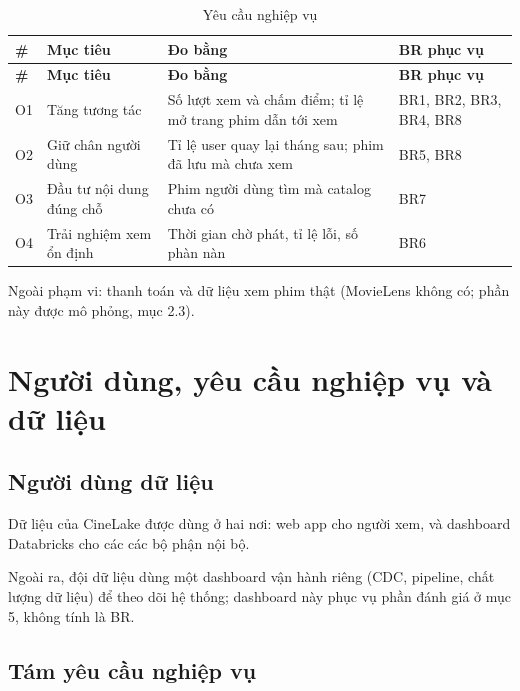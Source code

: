 \documentclass[a4paper,11pt]{article}
\newlength{\reporttablewidth}
\begin{document}
\begingroup
\small
{}
\setlength{\tabcolsep}{4pt}
\renewcommand{\arraystretch}{1.18}
\setlength{\reporttablewidth}{\dimexpr\linewidth-6\tabcolsep\relax}
\begin{longtable}{@{}L{0.08\reporttablewidth} L{0.28\reporttablewidth} L{0.43\reporttablewidth} L{0.21\reporttablewidth}@{}}
\caption[Yêu cầu nghiệp vụ (mục 1.2)]{Yêu cầu nghiệp vụ}\label{tab:01} \\
\toprule
\textbf{\#} & \textbf{Mục tiêu} & \textbf{Đo bằng} & \textbf{BR phục vụ} \\
\midrule
\endfirsthead
\toprule
\textbf{\#} & \textbf{Mục tiêu} & \textbf{Đo bằng} & \textbf{BR phục vụ} \\
\midrule
\endhead
\midrule
\endfoot
\bottomrule
\endlastfoot
O1 & Tăng tương tác & Số lượt xem và chấm điểm; tỉ lệ mở trang phim dẫn tới xem & BR1, BR2, BR3, BR4, BR8 \\
O2 & Giữ chân người dùng & Tỉ lệ user quay lại tháng sau; phim đã lưu mà chưa xem & BR5, BR8 \\
O3 & Đầu tư nội dung đúng chỗ & Phim người dùng tìm mà catalog chưa có & BR7 \\
O4 & Trải nghiệm xem ổn định & Thời gian chờ phát, tỉ lệ lỗi, số phàn nàn & BR6 \\
\end{longtable}
\endgroup

Ngoài phạm vi: thanh toán và dữ liệu xem phim thật (MovieLens không có; phần này được mô phỏng, mục 2.3).

\section{Người dùng, yêu cầu nghiệp vụ và dữ liệu}\label{sec:2}

\subsection{Người dùng dữ liệu}\label{sec:2.1}

Dữ liệu của CineLake được dùng ở hai nơi: web app cho người xem, và dashboard Databricks cho các các bộ phận nội bộ.

Ngoài ra, đội dữ liệu dùng một dashboard vận hành riêng (CDC, pipeline, chất lượng dữ liệu) để theo dõi hệ thống; dashboard này phục vụ phần đánh giá ở mục 5, không tính là BR.

\subsection{Tám yêu cầu nghiệp vụ}\label{sec:2.2}
\end{document}

